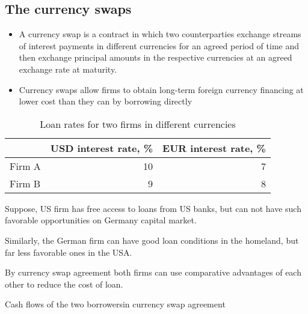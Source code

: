 \documentclass[international_finance_p1.tex]{subfiles}
\begin{document}
\subsection{The currency swaps}
\begin{frame}{}
\begin{itemize}[<+->]
\item
A currency swap is a contract in which two counterparties exchange streams of interest payments in different currencies for an agreed period of time and then exchange principal amounts in the respective currencies at an agreed exchange rate at maturity. 
\item
Currency swaps allow firms to obtain long-term foreign currency financing at lower cost than they can by borrowing directly
\end{itemize}
\end{frame}
\begin{frame}{}
\begin{table}[htbp]
  \centering
  \caption{Loan rates for two firms in different currencies}
    \begin{tabular}{lrr}
    \toprule
          & USD interest rate, \% & EUR interest rate, \% \\
    \midrule
    Firm A & 10    & 7 \\
    Firm B & 9     & 8 \\
    \bottomrule
    \end{tabular}%
  \label{tab:addlabel}%
\end{table}%
Suppose, US firm has free access to loans from US banks, but can not have such favorable opportunities on Germany capital market. 

Similarly, the German firm can have good loan conditions in the homeland, but far less favorable ones in the USA.

By currency swap agreement both firms can use comparative advantages of each other to reduce the cost of loan.

\end{frame}

\begin{frame}[shrink=10]{Cash flows of the two borrowers}{in currency swap agreement}
\begin{figure}
	\centering
	\begin{overprint}
	\end{overprint}
	\vspace*{-1.5em}
	\caption{}
\end{figure}
\end{frame}
\end{document}
